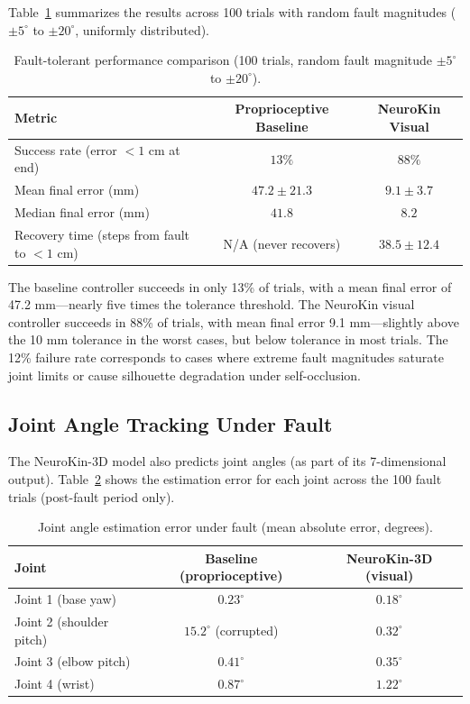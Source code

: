 \documentclass[12pt,a4paper,oneside]{report}
\begin{document}
Table~\ref{tab:fault_performance} summarizes the results across 100 trials with random fault magnitudes ($\pm5^\circ$ to $\pm20^\circ$, uniformly distributed).

\begin{table}[H]
\centering
\caption{Fault-tolerant performance comparison (100 trials, random fault magnitude $\pm5^\circ$ to $\pm20^\circ$).}
\label{tab:fault_performance}
\begin{tabular}{lcc}
\toprule
\textbf{Metric} & \textbf{Proprioceptive Baseline} & \textbf{NeuroKin Visual} \\
\midrule
Success rate (error $<1$ cm at end) & $13\%$ & $88\%$ \\
Mean final error (mm) & $47.2 \pm 21.3$ & $9.1 \pm 3.7$ \\
Median final error (mm) & $41.8$ & $8.2$ \\
Recovery time (steps from fault to $<1$ cm) & N/A (never recovers) & $38.5 \pm 12.4$ \\
\bottomrule
\end{tabular}
\end{table}

The baseline controller succeeds in only 13\% of trials, with a mean final error of 47.2 mm---nearly five times the tolerance threshold. The NeuroKin visual controller succeeds in 88\% of trials, with mean final error 9.1 mm---slightly above the 10 mm tolerance in the worst cases, but below tolerance in most trials. The 12\% failure rate corresponds to cases where extreme fault magnitudes saturate joint limits or cause silhouette degradation under self-occlusion.

\subsection{Joint Angle Tracking Under Fault}

The NeuroKin-3D model also predicts joint angles (as part of its 7-dimensional output). Table~\ref{tab:joint_errors} shows the estimation error for each joint across the 100 fault trials (post-fault period only).

\begin{table}[H]
\centering
\caption{Joint angle estimation error under fault (mean absolute error, degrees).}
\label{tab:joint_errors}
\begin{tabular}{lcc}
\toprule
Joint & Baseline (proprioceptive) & NeuroKin-3D (visual) \\
\midrule
Joint 1 (base yaw) & $0.23^\circ$ & $0.18^\circ$ \\
Joint 2 (shoulder pitch) & $15.2^\circ$ (corrupted) & $0.32^\circ$ \\
Joint 3 (elbow pitch) & $0.41^\circ$ & $0.35^\circ$ \\
Joint 4 (wrist) & $0.87^\circ$ & $1.22^\circ$ \\
\bottomrule
\end{tabular}
\end{table}
\end{document}
